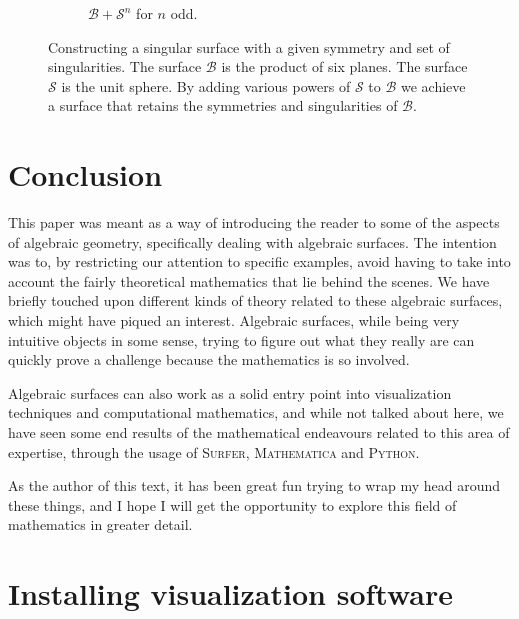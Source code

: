 \documentclass{article}
\begin{document}
\begin{figure}[h]
\begin{subfigure}[t]{0.2\textwidth}
            \caption{$\mathcal{B} + \mathcal{S}^n$ for $n$ odd.}
            \label{fig:construction_four}
        \end{subfigure}
        \caption{Constructing a singular surface with a given symmetry and set
            of singularities. The surface $\mathcal{B}$ is the product of six
            planes. The surface $\mathcal{S}$ is the unit sphere. By adding
            various powers of $\mathcal{S}$ to $\mathcal{B}$ we achieve a
        surface that retains the symmetries and singularities of
    $\mathcal{B}$.}
        \label{fig:construction}
    \end{figure}
    
    \section{Conclusion}
    \label{sec:conclusion}

    This paper was meant as a way of introducing the reader to some of the
    aspects of algebraic geometry, specifically dealing with algebraic
    surfaces. The intention was to, by restricting our attention to specific
    examples, avoid having to take into account the fairly theoretical
    mathematics that lie behind the scenes.  We have briefly touched upon
    different kinds of theory related to these algebraic surfaces, which might
    have piqued an interest.  Algebraic surfaces, while being very intuitive
    objects in some sense, trying to figure out what they really are can
    quickly prove a challenge because the mathematics is so involved. 

    Algebraic surfaces can also work as a solid entry point into visualization
    techniques and computational mathematics, and while not talked about here,
    we have seen some end results of the mathematical endeavours related to this
    area of expertise, through the usage of \textsc{Surfer},
    \textsc{Mathematica} and \textsc{Python}.

    As the author of this text, it has been great fun trying to wrap my head
    around these things, and I hope I will get the opportunity to explore this
    field of mathematics in greater detail.  
    \clearpage \appendix

    \section{Installing visualization software}
    
\end{document}
